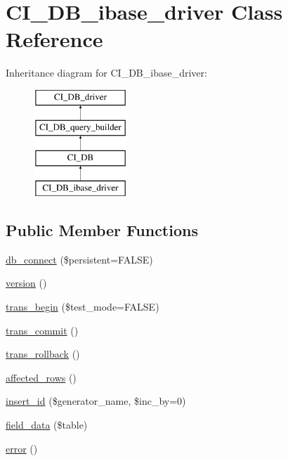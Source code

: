 \hypertarget{class_c_i___d_b__ibase__driver}{}\section{C\+I\+\_\+\+D\+B\+\_\+ibase\+\_\+driver Class Reference}
\label{class_c_i___d_b__ibase__driver}
Inheritance diagram for C\+I\+\_\+\+D\+B\+\_\+ibase\+\_\+driver\+:\begin{figure}[H]
\begin{center}
\leavevmode
\includegraphics[height=4.000000cm]{class_c_i___d_b__ibase__driver}
\end{center}
\end{figure}
\subsection*{Public Member Functions}
\begin{DoxyCompactItemize}
\item 
\hyperlink{class_c_i___d_b__ibase__driver_a52bf595e79e96cc0a7c907a9b45aeb4d}{db\+\_\+connect} (\$persistent=F\+A\+L\+S\+E)
\item 
\hyperlink{class_c_i___d_b__ibase__driver_a6080dae0886626b9a4cedb29240708b1}{version} ()
\item 
\hyperlink{class_c_i___d_b__ibase__driver_a90e153cf190d273336d77cce930587e1}{trans\+\_\+begin} (\$test\+\_\+mode=F\+A\+L\+S\+E)
\item 
\hyperlink{class_c_i___d_b__ibase__driver_af4fbdcdace4aa94a139b64877601fe9b}{trans\+\_\+commit} ()
\item 
\hyperlink{class_c_i___d_b__ibase__driver_a53f76d4dfcd6ac04fb653982442aeef8}{trans\+\_\+rollback} ()
\item 
\hyperlink{class_c_i___d_b__ibase__driver_a77248aaad33eb132c04cc4aa3f4bc8cb}{affected\+\_\+rows} ()
\item 
\hyperlink{class_c_i___d_b__ibase__driver_a148521f11a2aad9f228af62f59ec5130}{insert\+\_\+id} (\$generator\+\_\+name, \$inc\+\_\+by=0)
\item 
\hyperlink{class_c_i___d_b__ibase__driver_a90355121e1ed009e0efdbd544ab56efa}{field\+\_\+data} (\$table)
\item 
\hyperlink{class_c_i___d_b__ibase__driver_a43b8d30b879d4f09ceb059b02af2bc02}{error} ()
\end{DoxyCompactItemize}
